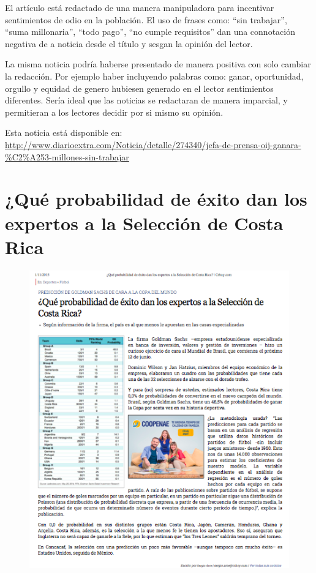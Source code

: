 \documentclass[times]{simauth}
\begin{document}
El artículo está redactado de una manera manipuladora para incentivar sentimientos de odio en la población.  El uso de frases como: ``sin trabajar'', ``suma millonaria'', ``todo pago'', ``no cumple requisitos'' dan una connotación negativa de a noticia desde el título y  sesgan la opinión del lector.

La misma noticia podría haberse presentado de manera positiva con solo cambiar la redacción. Por ejemplo haber incluyendo palabras como: ganar, oportunidad, orgullo y equidad de genero hubiesen generado en el lector sentimientos diferentes. 
Sería ideal que las noticias se redactaran de manera imparcial, y permitieran a los lectores decidir por si mismo su opinión. 

Esta noticia está disponible en: \href{http://www.diarioextra.com/Noticia/detalle/274340/jefa-de-prensa-oij-ganara-\%C2\%A253-millones-sin-trabajar}{http://www.diarioextra.com/Noticia/detalle/274340/jefa-de-prensa-oij-ganara-\%C2\%A253-millones-sin-trabajar}


\newpage
\section{¿Qué probabilidad de éxito dan los expertos a la Selección de Costa Rica}

\begin{figure}[h!]
    \centering
    \includegraphics[width=15cm]{exitoSeleccion}
    \label{fig:falacia4}
\end{figure}
\end{document}

